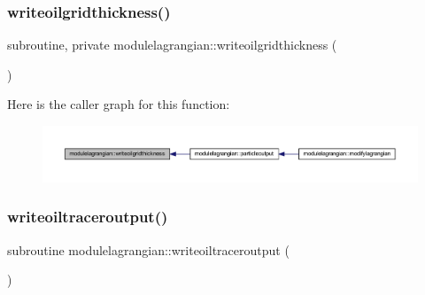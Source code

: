 \subsubsection{\texorpdfstring{writeoilgridthickness()}{writeoilgridthickness()}}
{\footnotesize\ttfamily subroutine, private modulelagrangian\+::writeoilgridthickness (\begin{DoxyParamCaption}{ }\end{DoxyParamCaption})\hspace{0.3cm}{\ttfamily [private]}}

Here is the caller graph for this function\+:\nopagebreak
\begin{figure}[H]
\begin{center}
\leavevmode
\includegraphics[width=350pt]{namespacemodulelagrangian_a8e2a2d0598e7ab5be827b9dd3693d75d_icgraph}
\end{center}
\end{figure}
\mbox{\label{namespacemodulelagrangian_af05b4830d15cd47fd3ed67c7bbffda15}} 
\subsubsection{\texorpdfstring{writeoiltraceroutput()}{writeoiltraceroutput()}}
{\footnotesize\ttfamily subroutine modulelagrangian\+::writeoiltraceroutput (\begin{DoxyParamCaption}{ }\end{DoxyParamCaption})\hspace{0.3cm}{\ttfamily [private]}}

